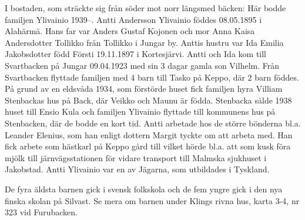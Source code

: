 I bostaden, som sträckte sig från söder mot norr längsmed bäcken:
Här bodde	familjen Ylivainio 1939--. Antti Andersson Ylivainio föddes 08.05.1895 i Alahärmä. Hans far var Anders Gustaf Kojonen och mor Anna Kaisa Andersdotter Tollikko från Tollikko i Jungar by. Anttis hustru var Ida Emilia Jakobsdotter född Försti 19.11.1897 i Kortesjärvi. Antti och Ida kom till Svartbacken på Jungar 09.04.1923 med sin 3 dagar gamla son Vilhelm. Från Svartbacken flyttade familjen med 4	barn till Tasko på Keppo, där 2 barn föddes. På grund av en eldsvåda 1934, som förstörde huset fick familjen hyra Villiam Stenbackas hus på	Back, där Veikko och Maunu är födda. Stenbacka sålde 1938 huset till Ensio Kula och familjen Ylivainio flyttade till kommunens hus på Stenbacken, där de bodde en kort tid. Antti arbetade hos de större 	bönderna bl.a. Leander Elenius, som han enligt dottern Margit tyckte om att arbeta med. Han fick arbete som hästkarl på Keppo gård till vilket hörde bl.a. att som kusk föra mjölk till järnvägsstationen för vidare transport till Malmska sjukhuset i Jakobstad. Antti Ylivainio var en av Jägarna, som utbildades i Tyskland.
\begin{jhchildren}
  \item {}
  \item {}
  \item {}
  \item {}
  \item {}
  \item {}
  \item {}
  \item {}
  \item {}
\end{jhchildren}
De fyra äldsta barnen gick i svensk folkskola och de fem yngre gick i den nya finska skolan på Silvast. Se mera om barnen under Klings rivna hus,	karta 3-4, nr 323 vid Furubacken.

